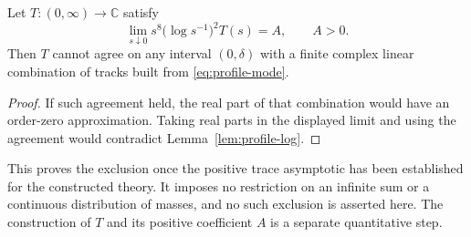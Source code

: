 \begin{theorem}\label{thm:profile-exclusion}
Let $T:(0,\infty)\to\mathbb C$ satisfy
\[
 \lim_{s\downarrow0}s^8\bigl(\log s^{-1}\bigr)^2T(s)=A,
 \qquad A>0.
\]
Then $T$ cannot agree on any interval $(0,\delta)$ with a finite complex
linear combination of tracks built from \eqref{eq:profile-mode}.
\end{theorem}
\begin{proof}
If such agreement held, the real part of that combination would have an
order-zero approximation. Taking real parts in the displayed limit and
using the agreement would contradict Lemma~\ref{lem:profile-log}.
\end{proof}
This proves the exclusion once the positive trace asymptotic has been
established for the constructed theory. It imposes no restriction on an
infinite sum or a continuous distribution of masses, and no such exclusion
is asserted here. The construction of $T$ and its positive coefficient $A$
is a separate quantitative step.

